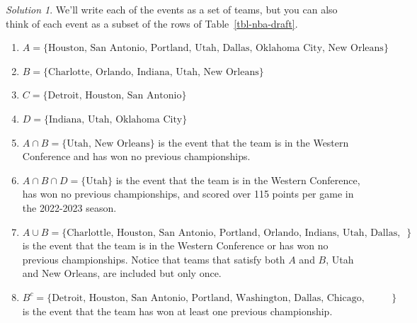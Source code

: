 \documentclass[
  letterpaper,
  DIV=11,
  numbers=noendperiod]{scrreprt}
\providecommand{\tightlist}{%
  \setlength{\itemsep}{0pt}\setlength{\parskip}{0pt}}
\theoremstyle{plain}
\theoremstyle{definition}
\theoremstyle{definition}
\theoremstyle{definition}
\theoremstyle{remark}
\newtheorem{refsolution}{Solution}[chapter]
\begin{document}
\begin{tcolorbox}[enhanced jigsaw, opacityback=0, rightrule=.15mm, coltitle=black, colframe=quarto-callout-tip-color-frame, toprule=.15mm, colbacktitle=quarto-callout-tip-color!10!white, opacitybacktitle=0.6, left=2mm, toptitle=1mm, breakable, title={Solution (click to expand)}, bottomtitle=1mm, colback=white, leftrule=.75mm, titlerule=0mm, arc=.35mm, bottomrule=.15mm]

\begin{refsolution}
We'll write each of the events as a set of teams, but you can also think
of each event as a subset of the rows of Table~\ref{tbl-nba-draft}.

\begin{enumerate}
\def\labelenumi{\arabic{enumi}.}
\tightlist
\item
  \(A = \{\text{Houston, San Antonio, Portland, Utah, Dallas, Oklahoma City, New Orleans}\}\)
\item
  \(B = \{\text{Charlotte, Orlando, Indiana, Utah, New Orleans}\}\)
\item
  \(C=\{\text{Detroit, Houston, San Antonio}\}\)
\item
  \(D = \{\text{Indiana, Utah, Oklahoma City}\}\)
\item
  \(A\cap B = \{\text{Utah, New Orleans}\}\) is the event that the team
  is in the Western Conference and has won no previous championships.
\item
  \(A \cap B \cap D=\{\text{Utah}\}\) is the event that the team is in
  the Western Conference, has won no previous championships, and scored
  over 115 points per game in the 2022-2023 season.
\item
  \(A \cup B=\{\text{Charlottle, Houston, San Antonio, Portland, Orlando, Indians, Utah, Dallas, Oklahoma City, New Orleans}\}\)
  is the event that the team is in the Western Conference or has won no
  previous championships. Notice that teams that satisfy both \(A\) and
  \(B\), Utah and New Orleans, are included but only once.
\item
  \(B^c=\{\text{Detroit, Houston, San Antonio, Portland, Washington, Dallas, Chicago, Oklahoma City, Toronto}\}\)
  is the event that the team has won at least one previous championship.
\end{enumerate}

\label{sol-simple-event}

\end{refsolution}

\end{tcolorbox}
\end{document}
